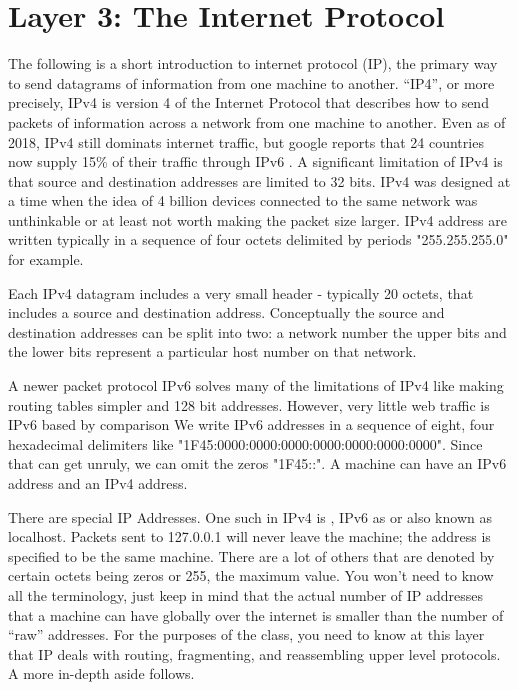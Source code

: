 \section{Layer 3: The Internet Protocol}

The following is a short introduction to internet protocol (IP), the primary way to send datagrams of information from one machine to another.
``IP4'', or more precisely, \gls{IPv4} is version 4 of the Internet Protocol that describes how to send \gls{packets} of information across a network from one machine to another.
Even as of 2018, IPv4 still dominats internet traffic, but google reports that 24 countries now supply 15\% of their traffic through IPv6 \cite{internet_society_2018}.
A significant limitation of IPv4 is that source and destination addresses are limited to 32 bits.
IPv4 was designed at a time when the idea of 4 billion devices connected to the same network was unthinkable or at least not worth making the packet size larger.
\gls{IPv4 address} are written typically in a sequence of four octets delimited by periods "255.255.255.0" for example.

Each IPv4 \gls{datagram} includes a very small header - typically 20 \gls{octets}, that includes a source and destination address.
Conceptually the source and destination addresses can be split into two: a network number the upper bits and the lower bits represent a particular host number on that network.

A newer packet protocol \gls{IPv6} solves many of the limitations of IPv4 like making routing tables simpler and 128 bit addresses.
However, very little web traffic is IPv6 based by comparison \cite{internet_society_2018}
We write IPv6 addresses in a sequence of eight, four hexadecimal delimiters like "1F45:0000:0000:0000:0000:0000:0000:0000".
Since that can get unruly, we can omit the zeros "1F45::". A machine can have an IPv6 address and an IPv4 address.

There are special IP Addresses.
One such in IPv4 is , IPv6 as  or  also known as localhost.
Packets sent to 127.0.0.1 will never leave the machine; the address is specified to be the same machine.
There are a lot of others that are denoted by certain octets being zeros or 255, the maximum value. You won't need to know all the terminology, just keep in mind that the actual number of IP addresses that a machine can have globally over the internet is smaller than the number of ``raw'' addresses.
For the purposes of the class, you need to know at this layer that IP deals with routing, fragmenting, and reassembling upper level protocols. A more in-depth aside follows.

